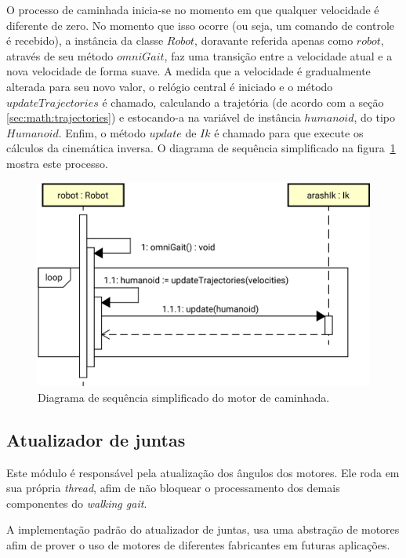 O processo de caminhada inicia-se no momento em que qualquer velocidade é diferente de zero. No momento que isso ocorre (ou seja, um comando de controle é recebido), a instância da classe $Robot$, doravante referida apenas como $robot$, através de seu método $omniGait$, faz uma transição entre a velocidade atual e a nova velocidade de forma suave. A medida que a velocidade é gradualmente alterada para seu novo valor, o relógio central é iniciado e o método $updateTrajectories$ é chamado, calculando a trajetória (de acordo com a seção \ref{sec:math:trajectories}) e estocando-a na variável de instância $humanoid$, do tipo $Humanoid$. Enfim, o método $update$ de $Ik$ é chamado para que execute os cálculos da cinemática inversa. O diagrama de sequência simplificado na figura~\ref{fig:architecture:walkinggait:walkengine:sequence} mostra este processo.

\begin{figure}[htb]
	\centering
	\includegraphics[scale=0.5]{imagens/svg/walkinggait-walkingengine-sequence}
	\caption{Diagrama de sequência simplificado do motor de caminhada.}
	\label{fig:architecture:walkinggait:walkengine:sequence}
\end{figure}

\subsection{Atualizador de juntas}
\label{subsec:architecture:walkinggait:jointsupdater}

Este módulo é responsável pela atualização dos ângulos dos motores. Ele roda em sua própria \textit{thread}, afim de não bloquear o processamento dos demais componentes do \textit{walking gait}.

A implementação padrão do atualizador de juntas, usa uma abstração de motores afim de prover o uso de motores de diferentes fabricantes em futuras aplicações.

